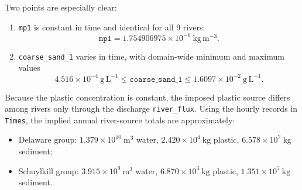 \documentclass[11pt]{article}
\begin{document}
Two points are especially clear:
\begin{enumerate}
\item \texttt{mp1} is constant in time and identical for all 9 rivers:
\[
\texttt{mp1} = 1.754906975\times 10^{-6}\ \mathrm{kg\,m^{-3}}.
\]
\item \texttt{coarse\_sand\_1} varies in time, with domain-wide minimum and maximum values
\[
4.516\times 10^{-4}\ \mathrm{g\,L^{-1}} \le \texttt{coarse\_sand\_1} \le 1.6097\times 10^{-2}\ \mathrm{g\,L^{-1}}.
\]
\end{enumerate}

Because the plastic concentration is constant, the imposed plastic source differs among rivers only
through the discharge \texttt{river\_flux}. Using the hourly records in \texttt{Times}, the implied annual
river-source totals are approximately:
\begin{itemize}
\item Delaware group: \(1.379\times 10^{10}\ \mathrm{m^3}\) water,
\(2.420\times 10^{4}\ \mathrm{kg}\) plastic,
\(6.578\times 10^{7}\ \mathrm{kg}\) sediment;
\item Schuylkill group: \(3.915\times 10^{9}\ \mathrm{m^3}\) water,
\(6.870\times 10^{3}\ \mathrm{kg}\) plastic,
\(1.351\times 10^{7}\ \mathrm{kg}\) sediment.
\end{itemize}
\end{document}
